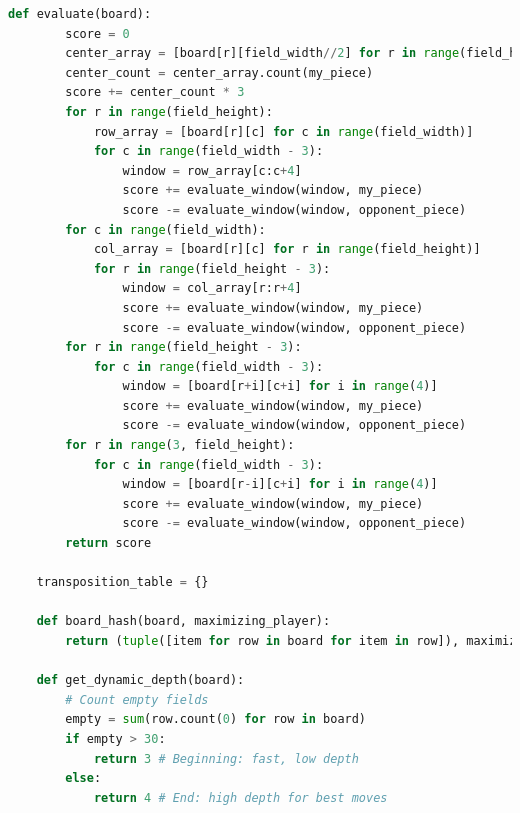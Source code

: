 \begin{lstlisting}[language=Python]
	def evaluate(board):
		score = 0
		center_array = [board[r][field_width//2] for r in range(field_height)]
		center_count = center_array.count(my_piece)
		score += center_count * 3
		for r in range(field_height):
			row_array = [board[r][c] for c in range(field_width)]
			for c in range(field_width - 3):
				window = row_array[c:c+4]
				score += evaluate_window(window, my_piece)
				score -= evaluate_window(window, opponent_piece)
		for c in range(field_width):
			col_array = [board[r][c] for r in range(field_height)]
			for r in range(field_height - 3):
				window = col_array[r:r+4]
				score += evaluate_window(window, my_piece)
				score -= evaluate_window(window, opponent_piece)
		for r in range(field_height - 3):
			for c in range(field_width - 3):
				window = [board[r+i][c+i] for i in range(4)]
				score += evaluate_window(window, my_piece)
				score -= evaluate_window(window, opponent_piece)
		for r in range(3, field_height):
			for c in range(field_width - 3):
				window = [board[r-i][c+i] for i in range(4)]
				score += evaluate_window(window, my_piece)
				score -= evaluate_window(window, opponent_piece)
		return score
	
	transposition_table = {}
	
	def board_hash(board, maximizing_player):
		return (tuple([item for row in board for item in row]), maximizing_player)
	
	def get_dynamic_depth(board):
		# Count empty fields
		empty = sum(row.count(0) for row in board)
		if empty > 30:
			return 3 # Beginning: fast, low depth
		else:
			return 4 # End: high depth for best moves
		

\end{lstlisting}
